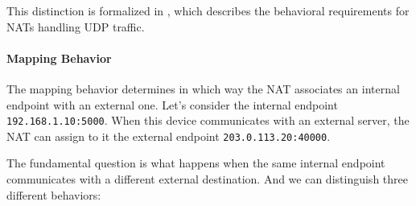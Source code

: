 This distinction is formalized in \cite{rfc4787}, which describes the behavioral requirements for NATs handling UDP traffic.

\paragraph{Mapping Behavior}
The mapping behavior determines in which way the NAT associates an internal endpoint with an external one. Let's consider the internal endpoint \texttt{192.168.1.10:5000}.
When this device communicates with an external server, the NAT can assign to it the external endpoint \texttt{203.0.113.20:40000}.

The fundamental question is what happens when the same internal endpoint communicates with a different external destination. And we can distinguish three different behaviors:

